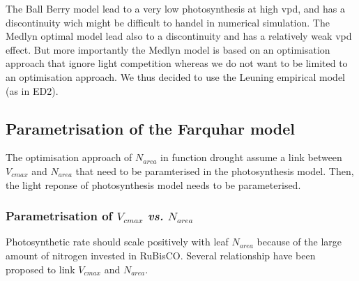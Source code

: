 \documentclass[a4paper,11pt]{article}
\begin{document}
\clearpage

The Ball Berry model lead to a very low photosynthesis at high vpd,
and has a discontinuity wich might be difficult to handel in numerical
simulation. The Medlyn optimal model lead also to a
discontinuity and has a relatively weak vpd effect. But more
importantly the Medlyn model is based on an optimisation approach that
ignore light competition whereas we do not want to be limited to an
optimisation approach. We thus decided to use the Leuning empirical
model (as in ED2). 




\pagebreak


\subsection{Parametrisation of the Farquhar model}

The optimisation approach of $N_{area}$ in function drought assume a
link between $V_{cmax}$ and $N_{area}$ that need to be paramterised in
the photosynthesis model. Then, the light reponse of photosynthesis model needs to be parameterised.

\subsubsection{Parametrisation of $V_{cmax}$ \textit{vs.} $N_{area}$}

Photosynthetic rate should scale positively with leaf $N_{area}$ because of the large amount of nitrogen invested in RuBisCO. Several relationship have been proposed to link $V_{cmax}$ and $N_{area}$.
\end{document}

